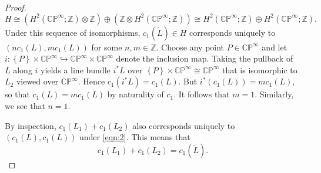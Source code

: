 \documentclass[10pt,letterpaper,cm]{nupset}
\theoremstyle{definition}
\theoremstyle{theorem}
\theoremstyle{remark}
\newcommand{\CP}{\mathbb{CP}}
\newcommand{\Z}{\mathbb Z}
\newcommand{\1}{\mathbb{1}}
\newcommand{\0}{\vec 0}
\begin{document}
\begin{proof}
\[H \cong  \left(H^2(\CP^{\infty}; \Z) \otimes \Z\right) \oplus \left(\Z \otimes H^2(\CP^{\infty}; \Z)\right)\cong H^2(\CP^{\infty}; \Z) \oplus H^2(\CP^{\infty}; \Z) . \tag{1}
\]  
Under this sequence of isomorphisms, $c_1(\tilde{L})\in H$ corresponds uniquely to $\left(nc_1(L), mc_1(L)\right)$ for some $n,m \in \Z$. Choose any point $P\in \CP^{\infty}$ and let $i : \left\{P\right\} \times \CP^{\infty} \hookrightarrow \CP^{\infty} \times \CP^{\infty}$ denote the inclusion map. Taking the pullback of $L$ along $i$ yields a line bundle $i^{\ast}{L}$ over $\left\{P\right\} \times \CP^{\infty} \cong \CP^{\infty}$ that is isomorphic to $L_2$ viewed over $\CP^{\infty}$. Hence $c_1(i^{\ast}{L}) = c_1(L)$. But $i^{\ast}(c_1(L)) = mc_1(L)$, so that $c_1(L)= mc_1(L)$ by naturality of $c_1$. It follows that $m=1$. Similarly, we see that $n=1$. 

\smallskip

By inspection,  $c_1(L_1) + c_1(L_2)$ also corresponds uniquely to $\left(c_1(L), c_1(L)\right)$ under \eqref{eqn:2}. This means that 
\[
\label{eqn:3} c_1(L_1) + c_1(L_2) = c_1(\tilde{L}).  \tag{2}
\]


\end{proof}
\end{document}
